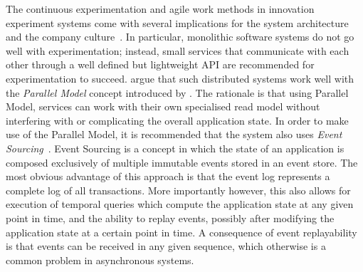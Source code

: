 The continuous experimentation and agile work methods in innovation experiment systems come with several implications for the system architecture and the company culture~\cite{Lindgren2015,Olsson2012}.
In particular, monolithic software systems do not go well with experimentation; instead, small services that communicate with each other through a well defined but lightweight API are recommended for experimentation to succeed.
\citet{ford2017building} argue that such distributed systems work well with the \emph{Parallel Model} concept introduced by \citet{WEB:Fowler:2005-2}.
The rationale is that using Parallel Model, services can work with their own specialised read model without interfering with or complicating the overall application state.
In order to make use of the Parallel Model, it is recommended that the system also uses \emph{Event Sourcing}~\cite{WEB:Fowler:2005,WEB:Fowler:2005-2}.
Event Sourcing is a concept in which the state of an application is composed exclusively of multiple immutable events stored in an event store.
The most obvious advantage of this approach is that the event log represents a complete log of all transactions.
More importantly however, this also allows for execution of temporal queries which compute the application state at any given point in time, and the ability to replay events, possibly after modifying the application state at a certain point in time.
A consequence of event replayability is that events can be received in any given sequence, which otherwise is a common problem in asynchronous systems.
